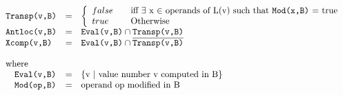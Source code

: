 \begin{equation}
\begin{array}{l c l}
\texttt{Transp(v,B)} &=& \left\{
                    \begin{array}{l l}
                        false & \quad \text{iff $\exists$ x $\in$ operands of L(v) such that \texttt{Mod(x,B)} = true}\\
                        true & \quad \text{Otherwise}
                    \end{array} \right. \\
\texttt{Antloc(v,B)} &=& \texttt{Eval(v,B)} \cap \texttt{Transp(v,B)} \\
\texttt{Xcomp(v,B)} &=& \texttt{Eval(v,B)} \cap \overline{\texttt{Transp(v,B)}}\\
  &&\\
\text{where}&& \\  
\quad \texttt{Eval(v,B)} &=& \text{\{v $|$ value number v computed in B\}}\\
\quad \texttt{Mod(op,B)} &=& \text{operand op modified in B}\\
\end{array}
\end{equation}

